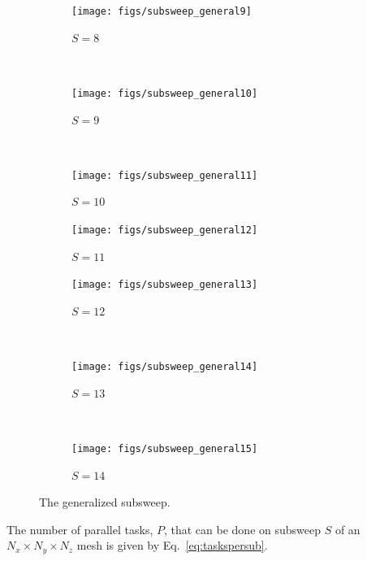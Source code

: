 \begin{figure}
    \begin{subfigure}[b]{0.2\textwidth}
        \texttt{[image: figs/subsweep\_general9]}
        \caption{$S=8$}
        \label{fig:subsweep_general9}
    \end{subfigure}
    ~ %
    \begin{subfigure}[b]{0.2\textwidth}
        \texttt{[image: figs/subsweep\_general10]}
        \caption{$S=9$}
        \label{fig:subsweep_general10}
    \end{subfigure}
    ~ %
    \begin{subfigure}[b]{0.2\textwidth}
        \texttt{[image: figs/subsweep\_general11]}
        \caption{$S=10$}
        \label{fig:subsweep_general11}
    \end{subfigure}
    \begin{subfigure}[b]{0.2\textwidth}
        \texttt{[image: figs/subsweep\_general12]}
        \caption{$S=11$}
        \label{fig:subsweep_general12}
    \end{subfigure}
    
    \begin{subfigure}[b]{0.2\textwidth}
        \texttt{[image: figs/subsweep\_general13]}
        \caption{$S=12$}
        \label{fig:subsweep_general13}
    \end{subfigure}
    ~ %
    \begin{subfigure}[b]{0.2\textwidth}
        \texttt{[image: figs/subsweep\_general14]}
        \caption{$S=13$}
        \label{fig:subsweep_general14}
    \end{subfigure}
    ~ %
    \begin{subfigure}[b]{0.2\textwidth}
        \texttt{[image: figs/subsweep\_general15]}
        \caption{$S=14$}
        \label{fig:subsweep_general15}
    \end{subfigure}
    \caption{The generalized subsweep.}\label{fig:subsweep_general}
\end{figure}

The number of parallel tasks, $P$, that can be done on subsweep $S$ of an $N_x \times N_y \times N_z$ mesh is given by Eq.~\ref{eq:taskspersub}.

